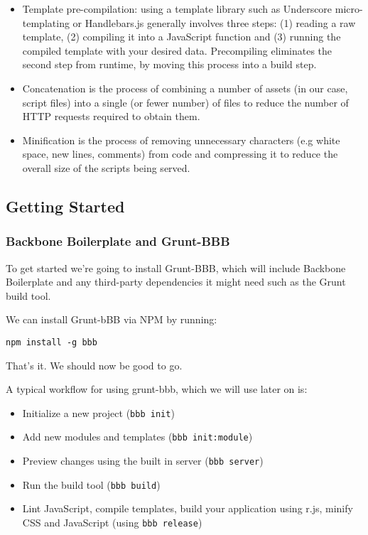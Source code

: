 \documentclass[9pt]{book}
\begin{document}
\begin{itemize}
\itemsep1pt\parskip0pt
\item
  Template pre-compilation: using a template library such as Underscore
  micro-templating or Handlebars.js generally involves three steps: (1)
  reading a raw template, (2) compiling it into a JavaScript function
  and (3) running the compiled template with your desired data.
  Precompiling eliminates the second step from runtime, by moving this
  process into a build step.
\item
  Concatenation is the process of combining a number of assets (in our
  case, script files) into a single (or fewer number) of files to reduce
  the number of HTTP requests required to obtain them.
\item
  Minification is the process of removing unnecessary characters (e.g
  white space, new lines, comments) from code and compressing it to
  reduce the overall size of the scripts being served.
\end{itemize}

\subsection{Getting Started}\label{getting-started}

\subsubsection{Backbone Boilerplate and
Grunt-BBB}\label{backbone-boilerplate-and-grunt-bbb-1}

To get started we're going to install Grunt-BBB, which will include
Backbone Boilerplate and any third-party dependencies it might need such
as the Grunt build tool.

We can install Grunt-bBB via NPM by running:

\begin{verbatim}
npm install -g bbb
\end{verbatim}

That's it. We should now be good to go.

A typical workflow for using grunt-bbb, which we will use later on is:

\begin{itemize}
\itemsep1pt\parskip0pt
\item
  Initialize a new project (\texttt{bbb init})
\item
  Add new modules and templates (\texttt{bbb init:module})
\item
  Preview changes using the built in server (\texttt{bbb server})
\item
  Run the build tool (\texttt{bbb build})
\item
  Lint JavaScript, compile templates, build your application using r.js,
  minify CSS and JavaScript (using \texttt{bbb release})
\end{itemize}
\end{document}
